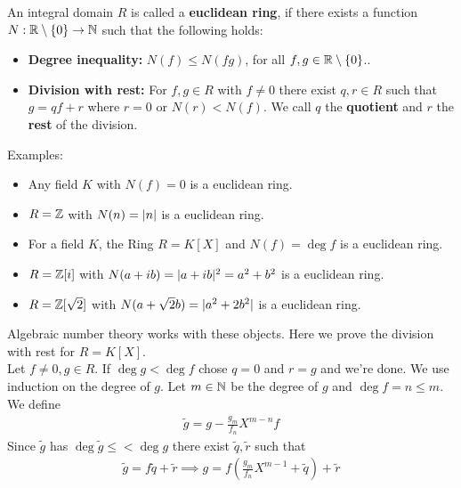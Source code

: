 \begin{definition}[]
	An integral domain $R$ is called a \textbf{euclidean ring}, if there exists a function  $N: \mathbb{R} \setminus \{0\} \to \mathbb{N}$ such that
	the following holds:
	\begin{itemize}
		\item \textbf{Degree inequality:} $N(f) \leq N(fg)$, for all $f,g \in \mathbb{R} \setminus \{0\}$..
		\item \textbf{Division with rest:}	For $f,g \in R$ with $f \neq 0$ there exist $q,r \in R$ such that $g = qf + r$ where $r = 0$ or $N(r) < N(f)$. We call $q$ the \textbf{quotient}  and $r$ the \textbf{rest} of the division.
	\end{itemize}
\end{definition}
Examples:
\begin{itemize}
\item Any field $K$ with $N(f) = 0$ is a euclidean ring. 
\item $R = \mathbb{Z}$ with $N(n) = \vert n\vert$ is a euclidean ring.
\item For a field $K$, the Ring $R = K[X]$ and $N(f) = \deg f$ is a euclidean ring.
\item $R = \mathbb{Z}[i]$ with $N(a + ib) = \vert a + ib\vert^2 = a^2 + b^2$ is a euclidean ring.
\item $R = \mathbb{Z}[\sqrt{2}]$ with $N(a + \sqrt{2}b) = \vert a^2 + 2b^2\vert$ is a euclidean ring.
\end{itemize}
Algebraic number theory works with these objects. Here we prove the division with rest for $R = K[X]$.\\
Let $f \neq 0, g \in R$. If $\deg g < \deg f$ chose $q = 0$ and $r = g$ and we're done. We use induction on the degree of $g$. Let $m \in \mathbb{N}$ be the degree of $g$ and $\deg f = n \leq m$. We define
\begin{align*}
	\tilde{g} = g - \frac{g_m}{f_n}X^{m-n}f
\end{align*}
Since $\tilde{g}$ has $\deg \tilde{g} \leq < \deg g$ there exist $\tilde{q}, \tilde{r}$ such that
\begin{align*}
	\tilde{g} = f \tilde{q} + \tilde{r} \implies g = f(\frac{g_m}{f_n}X^{m-1} + \tilde{q}) + \tilde{r}
\end{align*}
